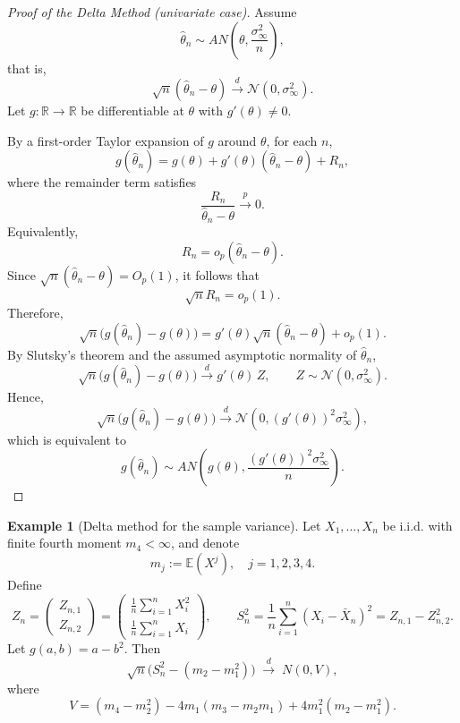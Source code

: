 \documentclass[11pt]{article}
\theoremstyle{definition}
\newtheorem{exmp}{Example}[section]
\begin{document}
\begin{proof}[Proof of the Delta Method (univariate case)]
Assume
\[
\hat{\theta}_n \sim AN\!\left(\theta, \frac{\sigma_\infty^2}{n}\right),
\]
that is,
\[
\sqrt{n}(\hat{\theta}_n - \theta) \xrightarrow{d} \mathcal{N}(0, \sigma_\infty^2).
\]
Let $g:\mathbb{R} \to \mathbb{R}$ be differentiable at $\theta$ with $g'(\theta) \neq 0$.

By a first-order Taylor expansion of $g$ around $\theta$, for each $n$,
\[
g(\hat{\theta}_n)
= g(\theta) + g'(\theta)(\hat{\theta}_n - \theta) + R_n,
\]
where the remainder term satisfies
\[
\frac{R_n}{\hat{\theta}_n - \theta} \xrightarrow{p} 0.
\]
Equivalently,
\[
R_n = o_p(\hat{\theta}_n - \theta).
\]
Since $\sqrt{n}(\hat{\theta}_n - \theta) = O_p(1)$, it follows that
\[
\sqrt{n} R_n = o_p(1).
\]
Therefore,
\[
\sqrt{n}\big( g(\hat{\theta}_n) - g(\theta) \big)
= g'(\theta) \sqrt{n}(\hat{\theta}_n - \theta) + o_p(1).
\]
By Slutsky's theorem and the assumed asymptotic normality of $\hat{\theta}_n$,
\[
\sqrt{n}\big( g(\hat{\theta}_n) - g(\theta) \big)
\xrightarrow{d}
g'(\theta)\, Z,
\qquad Z \sim \mathcal{N}(0, \sigma_\infty^2).
\]
Hence,
\[
\sqrt{n}\big( g(\hat{\theta}_n) - g(\theta) \big)
\xrightarrow{d}
\mathcal{N}\!\left(0, (g'(\theta))^2 \sigma_\infty^2 \right),
\]
which is equivalent to
\[
g(\hat{\theta}_n) \sim AN\!\left( g(\theta), \frac{(g'(\theta))^2 \sigma_\infty^2}{n} \right).
\]
\end{proof}

\begin{exmp}[Delta method for the sample variance]
Let $X_1,\dots,X_n$ be i.i.d. with finite fourth moment $m_4<\infty$, and denote
\[
m_j := \mathbb{E}(X^j), \quad j=1,2,3,4.
\]
Define
\[
Z_n =
\begin{pmatrix}
Z_{n,1} \\
Z_{n,2}
\end{pmatrix}
=
\begin{pmatrix}
\frac{1}{n}\sum_{i=1}^n X_i^2 \\
\frac{1}{n}\sum_{i=1}^n X_i
\end{pmatrix},
\qquad
S_n^2
=
\frac{1}{n}\sum_{i=1}^n (X_i-\bar X_n)^2
=
Z_{n,1}-Z_{n,2}^2.
\]
Let $g(a,b)=a-b^2$. Then
\[
\sqrt{n}\big(S_n^2 - (m_2 - m_1^2)\big)
\;\xrightarrow{d}\;
N(0, V),
\]
where
\[
V
=
(m_4 - m_2^2)
- 4 m_1 (m_3 - m_2 m_1)
+ 4 m_1^2 (m_2 - m_1^2).
\]
\end{exmp}
\end{document}
